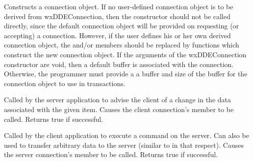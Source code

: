 
\label{wxddeconnectionctor}



Constructs a connection object. If no user-defined connection object is
to be derived from wxDDEConnection, then the constructor should not be
called directly, since the default connection object will be provided on
requesting (or accepting) a connection. However, if the user defines his
or her own derived connection object, the \rtfsp
and/or  members should be replaced by
functions which construct the new connection object. If the arguments of
the wxDDEConnection constructor are void, then a default buffer is
associated with the connection. Otherwise, the programmer must provide a
a buffer and size of the buffer for the connection object to use in
transactions.

\label{wxddeconnectionadvise}


Called by the server application to advise the client of a change in
the data associated with the given item. Causes the client
connection's 
member to be called. Returns true if successful.

\label{wxddeconnectionexecute}


Called by the client application to execute a command on the server. Can
also be used to transfer arbitrary data to the server (similar
to  in that respect). Causes the
server connection's  member to be
called. Returns true if successful.

\label{wxddeconnectiondisconnect}

